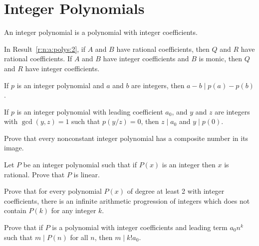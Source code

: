 \section{Integer Polynomials}
An integer polynomial is a polynomial with integer coefficients.
\begin{result}{\label{r:n:n:p:1}}
    In Result~\ref{r:n:a:polys:2}, if $A$ and $B$ have rational coefficients,
    then $Q$ and $R$
    have rational coefficients. If $A$ and $B$ have integer coefficients and $B$
    is monic, then $Q$ and $R$ have integer coefficients.
\end{result}
\begin{result}{\label{r:n:n:p:2}}
    If $p$ is an integer polynomial and $a$ and $b$ are
    integers, then $a-b\mid p(a)-p(b)$.
\end{result}
\begin{result}{\label{r:n:n:p:3}}
  If $p$ is an integer polynomial with leading coefficient $a_0$,
  and $y$ and $z$ are integers with $\gcd(y,z)=1$
    such that $p(y/z)=0$, then $z\mid a_0$ and $y\mid p(0)$.
\end{result}
\begin{problem}{\label{p:n:n:p:1}}
  Prove that every nonconstant integer polynomial has a composite number
    in its image.
\end{problem}
\begin{problem}{\label{p:n:n:p:2}}
  Let $P$ be an integer polynomial such that if $P(x)$ is an integer then
    $x$ is rational. Prove that $P$ is linear.
\end{problem}
\begin{problem}{\label{p:n:n:p:3}}
  Prove that for every polynomial $P(x)$ of degree at least 2 with integer
    coefficients, there is an infinite arithmetic
    progression of integers which does not contain $P(k)$ for any integer $k$.
\end{problem}
\begin{problem}{\label{p:n:n:p:4}}
  Prove that if $P$ is a polynomial with integer coefficients and leading term $a_0n^k$ such
    that $m\mid P(n)$ for all $n$, then $m\mid k!a_0$.
\end{problem}
